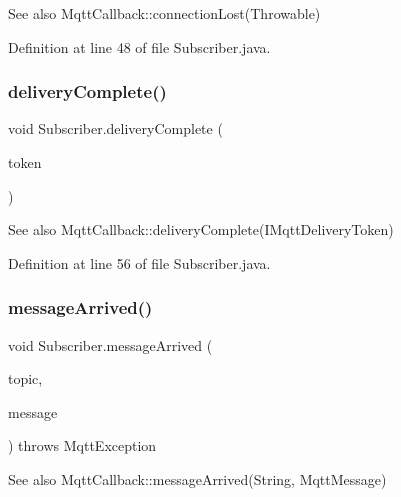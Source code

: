 \begin{DoxySeeAlso}{See also}
Mqtt\+Callback\+::connection\+Lost(\+Throwable) 
\end{DoxySeeAlso}


Definition at line 48 of file Subscriber.\+java.

\mbox{\label{class_subscriber_a4388b1af8842ea5da82f32907763d1da}} 
\subsubsection{\texorpdfstring{delivery\+Complete()}{deliveryComplete()}}
{\footnotesize\ttfamily void Subscriber.\+delivery\+Complete (\begin{DoxyParamCaption}\item[{I\+Mqtt\+Delivery\+Token}]{token }\end{DoxyParamCaption})\hspace{0.3cm}{\ttfamily [inline]}}

\begin{DoxySeeAlso}{See also}
Mqtt\+Callback\+::delivery\+Complete(\+I\+Mqtt\+Delivery\+Token) 
\end{DoxySeeAlso}


Definition at line 56 of file Subscriber.\+java.

\mbox{\label{class_subscriber_a2d2a1601b617c73fd30fe6b70ed32482}} 
\subsubsection{\texorpdfstring{message\+Arrived()}{messageArrived()}}
{\footnotesize\ttfamily void Subscriber.\+message\+Arrived (\begin{DoxyParamCaption}\item[{String}]{topic,  }\item[{Mqtt\+Message}]{message }\end{DoxyParamCaption}) throws Mqtt\+Exception\hspace{0.3cm}{\ttfamily [inline]}}

\begin{DoxySeeAlso}{See also}
Mqtt\+Callback\+::message\+Arrived(\+String, Mqtt\+Message) 
\end{DoxySeeAlso}


